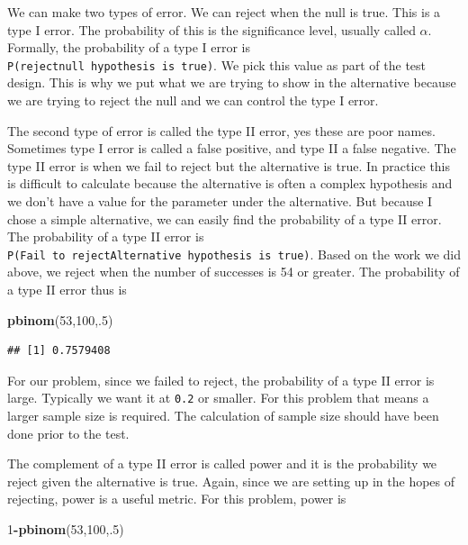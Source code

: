 \documentclass[]{book}
\newenvironment{Shaded}{\begin{snugshade}}{\end{snugshade}}
\newcommand{\KeywordTok}[1]{\textcolor[rgb]{0.13,0.29,0.53}{\textbf{#1}}}
\newcommand{\DecValTok}[1]{\textcolor[rgb]{0.00,0.00,0.81}{#1}}
\newcommand{\OperatorTok}[1]{\textcolor[rgb]{0.81,0.36,0.00}{\textbf{#1}}}
\newcommand{\NormalTok}[1]{#1}
\theoremstyle{definition}
\theoremstyle{definition}
\theoremstyle{definition}
\theoremstyle{remark}
\begin{document}
We can make two types of error. We can reject when the null is true.
This is a type I error. The probability of this is the significance
level, usually called \(\alpha\). Formally, the probability of a type I
error is \texttt{P(reject\textbar{}null\ hypothesis\ is\ true)}. We pick
this value as part of the test design. This is why we put what we are
trying to show in the alternative because we are trying to reject the
null and we can control the type I error.

The second type of error is called the type II error, yes these are poor
names. Sometimes type I error is called a false positive, and type II a
false negative. The type II error is when we fail to reject but the
alternative is true. In practice this is difficult to calculate because
the alternative is often a complex hypothesis and we don't have a value
for the parameter under the alternative. But because I chose a simple
alternative, we can easily find the probability of a type II error. The
probability of a type II error is
\texttt{P(Fail\ to\ reject\textbar{}Alternative\ hypothesis\ is\ true)}.
Based on the work we did above, we reject when the number of successes
is 54 or greater. The probability of a type II error thus is

\begin{Shaded}
\begin{Highlighting}[]
\KeywordTok{pbinom}\NormalTok{(}\DecValTok{53}\NormalTok{,}\DecValTok{100}\NormalTok{,.}\DecValTok{5}\NormalTok{)}
\end{Highlighting}
\end{Shaded}

\begin{verbatim}
## [1] 0.7579408
\end{verbatim}

For our problem, since we failed to reject, the probability of a type II
error is large. Typically we want it at \texttt{0.2} or smaller. For
this problem that means a larger sample size is required. The
calculation of sample size should have been done prior to the test.

The complement of a type II error is called power and it is the
probability we reject given the alternative is true. Again, since we are
setting up in the hopes of rejecting, power is a useful metric. For this
problem, power is

\begin{Shaded}
\begin{Highlighting}[]
\DecValTok{1}\OperatorTok{-}\KeywordTok{pbinom}\NormalTok{(}\DecValTok{53}\NormalTok{,}\DecValTok{100}\NormalTok{,.}\DecValTok{5}\NormalTok{)}
\end{Highlighting}
\end{Shaded}
\end{document}
